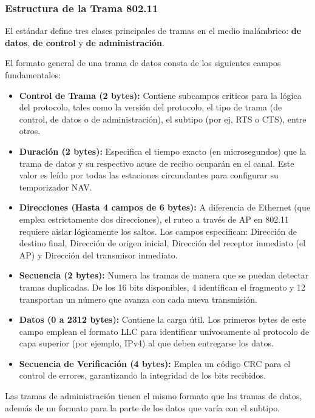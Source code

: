 \subsubsection{Estructura de la Trama 802.11}

El estándar define tres clases principales de tramas en el medio inalámbrico: \textbf{de datos}, \textbf{de control} y \textbf{de administración}.

El formato general de una trama de datos consta de los siguientes campos fundamentales:

\begin{itemize}
    \item \textbf{Control de Trama (2 bytes):} Contiene subcampos críticos para la lógica del protocolo, tales como la versión del protocolo, el tipo de trama (de control, de datos o de administración), el subtipo (por ej, RTS o CTS), entre otros.
    \item \textbf{Duración (2 bytes):} Especifica el tiempo exacto (en microsegundos) que la trama de datos y su respectivo acuse de recibo  ocuparán en el canal. Este valor es leído por todas las estaciones circundantes para configurar su temporizador NAV.
    \item \textbf{Direcciones (Hasta 4 campos de 6 bytes):} A diferencia de Ethernet (que emplea estrictamente dos direcciones), el ruteo a través de AP en 802.11 requiere aislar lógicamente los saltos. Los campos especifican: Dirección de destino final, Dirección de origen inicial, Dirección del receptor inmediato (el AP) y Dirección del transmisor inmediato.
    \item \textbf{Secuencia (2 bytes):} Numera las tramas de manera que se puedan detectar tramas duplicadas. De los 16 bits disponibles, 4 identifican el fragmento y 12 transportan un número que avanza con cada nueva transmisión.
    \item \textbf{Datos (0 a 2312 bytes):} Contiene la carga útil. Los primeros bytes de este campo emplean el formato LLC para identificar unívocamente al protocolo de capa superior (por ejemplo, IPv4) al que deben entregarse los datos.
    \item \textbf{Secuencia de Verificación (4 bytes):} Emplea un código CRC para el control de errores, garantizando la integridad de los bits recibidos.
\end{itemize}

Las tramas de administración tienen el mismo formato que las tramas de datos, además de un formato para la parte de los datos que varía con el subtipo. 

